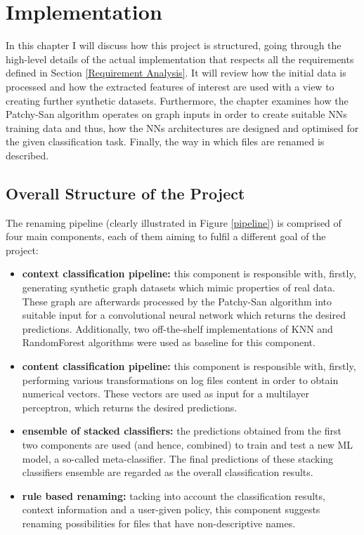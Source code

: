 

\chapter{Implementation}

In this chapter I will discuss how this project is structured, going through the high-level details of the actual implementation that respects all the requirements defined in Section \ref{Requirement Analysis}. It will review how the initial data is processed and how the extracted features of interest are used with a view to creating further synthetic datasets. Furthermore, the chapter examines how the Patchy-San algorithm operates on graph inputs in order to create suitable NNs training data and thus, how the NNs architectures are designed and optimised for the given classification task. Finally, the way in which files are renamed is described. 



\section{Overall Structure of the Project}

The renaming pipeline (clearly illustrated in Figure \ref{pipeline}) is comprised of four main components, each of them aiming to fulfil a different goal of the project:

\begin{itemize}
    \item \textbf{context classification pipeline:} this component is responsible with, firstly, generating synthetic graph datasets which mimic properties of real data. These graph are afterwards processed by the Patchy-San algorithm into suitable input for a convolutional neural network  which returns the desired predictions. Additionally, two off-the-shelf implementations of KNN and RandomForest algorithms were used as baseline for this component. 

    \item \textbf{content classification pipeline:} this component is responsible with, firstly, performing various transformations on log files content in order to obtain numerical vectors. These vectors are used as input for a multilayer perceptron, which returns the desired predictions.
    
    \item \textbf{ensemble of stacked classifiers:} the predictions obtained from the first two components are used (and hence, combined) to train and test a new ML model, a so-called meta-classifier. The final predictions of these stacking classifiers ensemble are regarded as the overall classification results. 
    
    \item \textbf{rule based renaming:} tacking into account the classification results, context information and a user-given policy, this component suggests renaming possibilities for files that have non-descriptive names. 
    
\end{itemize}

